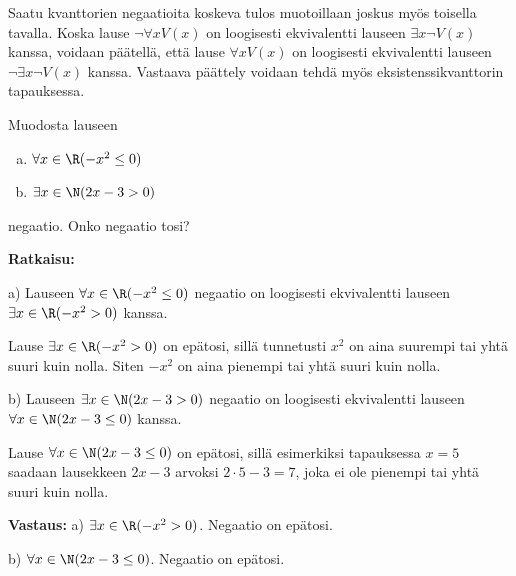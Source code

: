 Saatu kvanttorien negaatioita koskeva tulos muotoillaan joskus myös toisella tavalla. Koska lause $\lnot \forall x V(x)$ on loogisesti ekvivalentti lauseen $\exists x\lnot V(x)$ kanssa, voidaan päätellä, että lause $\forall x V(x)$ on loogisesti ekvivalentti lauseen $\lnot \exists x\lnot V(x)$ kanssa. Vastaava päättely voidaan tehdä myös eksistenssikvanttorin tapauksessa.


\begin{esimerkki}
Muodosta lauseen
\begin{enumerate}[a)]
\item $\forall x \in \R(-x^2 \le 0)$
\item $\exists x\in \N(2x-3>0)$
\end{enumerate}
negaatio. Onko negaatio tosi?

{\bf Ratkaisu:}

a) Lauseen $\forall x \in \R(-x^2 \le 0)$ negaatio on loogisesti ekvivalentti lauseen $\exists x\in \R (-x^2 > 0)$ kanssa.

Lause $\exists x\in \R (-x^2> 0)$ on epätosi, sillä tunnetusti $x^2$ on aina suurempi tai yhtä suuri kuin nolla. Siten $-x^2$ on aina pienempi tai yhtä suuri kuin nolla.

b) Lauseen $\exists x\in \N(2x-3>0)$ negaatio on loogisesti ekvivalentti lauseen $\forall x\in \N(2x-3 \le 0)$ kanssa.

Lause $\forall x\in \N(2x-3 \le 0)$ on epätosi, sillä esimerkiksi tapauksessa $x=5$ saadaan lausekkeen $2x - 3$ arvoksi $2\cdot 5 -3 = 7$, joka ei ole pienempi tai yhtä suuri kuin nolla.

{\bf Vastaus:} a) $\exists x\in \R (-x^2 > 0)$. Negaatio on epätosi. 

b) $\forall x\in \N(2x-3 \le 0)$. Negaatio on epätosi.
\end{esimerkki}




\Harjoitustehtavat

